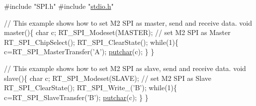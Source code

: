 \begin{DoxyCode}
\textcolor{preprocessor}{#include "SPI.h"}
\textcolor{preprocessor}{#include "\mbox{\hyperlink{a00026}{stdio.h}}"}

\textcolor{comment}{// This example shows how to set M2 SPI as master, send and receive data.}
\textcolor{keywordtype}{void} master()\{
    \textcolor{keywordtype}{char} c;
    RT\_SPI\_Modeset(MASTER);             \textcolor{comment}{// set M2 SPI as Master}
    RT\_SPI\_ChipSelect();
    RT\_SPI\_ClearState();
    \textcolor{keywordflow}{while}(1)\{
        c=RT\_SPI\_MasterTransfer(\textcolor{charliteral}{'A'});
        \mbox{\hyperlink{a00026_a948b7a0779c308ac5502c57e282e6933}{putchar}}(c);
    \}
\}

\textcolor{comment}{// This example shows how to set M2 SPI as slave, send and receive data.}
\textcolor{keywordtype}{void} slave()\{
    \textcolor{keywordtype}{char} c;
    RT\_SPI\_Modeset(SLAVE);              \textcolor{comment}{// set M2 SPI as Slave}
    RT\_SPI\_ClearState();
    RT\_SPI\_Write\_(\textcolor{charliteral}{'B'});
    \textcolor{keywordflow}{while}(1)\{
        c=RT\_SPI\_SlaveTransfer(\textcolor{charliteral}{'B'});
        \mbox{\hyperlink{a00026_a948b7a0779c308ac5502c57e282e6933}{putchar}}(c);
    \}
\}
\end{DoxyCode}
 